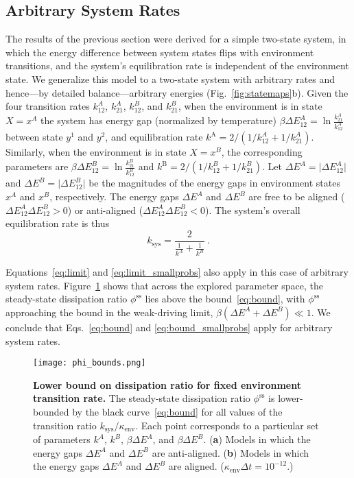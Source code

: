 \documentclass[entropy,article,
submit,
moreauthors,pdftex,10pt,a4paper]{mdpi}
\newcommand{\phiSS}{\phi^{\mathrm{ss}}}
\newcommand{\kenv}{\kappa_\mathrm{env}}
\newcommand{\ksys}{k_\mathrm{sys}}
\newcommand{\kstar}{\ksys/\kenv}
\begin{document}
\subsection{Arbitrary System Rates}
The results of the previous section were derived for a simple two-state system, in which the energy difference between system states flips with environment transitions, and the system's equilibration rate is independent of the environment state. We generalize this model to a two-state system with arbitrary rates and hence---by detailed balance---arbitrary energies (Fig.~\ref{fig:statemaps}b). Given the four transition rates $k_{12}^{A}$, $k_{21}^{A}$, $k_{12}^{B}$, and $k_{21}^{B}$, when the environment is in state $X=x^{A}$ the system has energy gap (normalized by temperature) $\beta \Delta E^A_{12} = \ln \frac{k_{21}^{A}}{k_{12}^{A}}$ between state $y^1$ and $y^2$, and equilibration rate $k^\mathrm{A}=2/(1/k_{12}^{A}+1/k_{21}^{A})$. Similarly, when the environment is in state $X=x^{B}$, the corresponding parameters are $\beta \Delta E^B_{12} = \ln \frac{k_{21}^{B}}{k_{12}^{B}}$ and $k^\mathrm{B}=2/(1/k_{12}^{B}+1/k_{21}^{B})$. Let $\Delta E^A=\lvert \Delta E^A_{12} \rvert$ and $\Delta E^B=\lvert \Delta E^B_{12} \rvert$ be the magnitudes of the energy gaps in environment states $x^A$ and $x^B$, respectively. 
The energy gaps $\Delta E^A$ and $\Delta E^B$ are free to be aligned ($\Delta E^A_{12} \Delta E^B_{12} > 0$) or anti-aligned ($\Delta E^A_{12} \Delta E^B_{12} < 0$).
The system's overall equilibration rate is thus
\begin{equation}
	\label{eq:ksys_unweighted}
	k_\mathrm{sys}=\frac{2}{\frac{1}{k^A}+\frac{1}{k^B}} \ . 
\end{equation}

Equations~\eqref{eq:limit} and \eqref{eq:limit_smallprobs} also apply in this case of arbitrary system rates.
Figure~\ref{fig:phi_bound} shows that across the explored parameter space, the steady-state dissipation ratio $\phiSS$ lies above the bound~\eqref{eq:bound}, with $\phiSS$ approaching the bound in the weak-driving limit, $\beta (\Delta E^A+\Delta E^B) \ll 1$. 
We conclude that Eqs.~\eqref{eq:bound} and \eqref{eq:bound_smallprobs} apply for arbitrary system rates.

\begin{figure}[H]
\centering
\texttt{[image: phi\_bounds.png]}
\caption{{\bf Lower bound on dissipation ratio for fixed environment transition rate.}
The steady-state dissipation ratio $\phiSS$ is lower-bounded by the black curve~\eqref{eq:bound} for all values of the transition ratio $\kstar$. Each point corresponds to a particular set of parameters $k^A$, $k^B$, $\beta \Delta E^A$, and $\beta \Delta E^B$. (\textbf{a}) Models in which the energy gaps $\Delta E^A$ and $\Delta E^B$ are anti-aligned. (\textbf{b}) Models in which the energy gaps $\Delta E^A$ and $\Delta E^B$ are aligned. ($\kenv\Delta t = 10^{-12}$.)}
\label{fig:phi_bound}
\end{figure}
\end{document}

